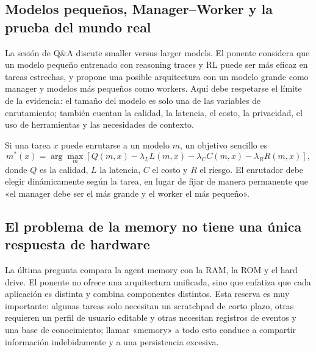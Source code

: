 \documentclass[a4paper]{article}
\begin{document}
\subsection{Modelos pequeños, Manager--Worker y la prueba del mundo real}

La sesión de Q\&A discute smaller versus larger models. El ponente considera que un modelo pequeño entrenado con reasoning traces y RL puede ser más eficaz en tareas estrechas, y propone una posible arquitectura con un modelo grande como manager y modelos más pequeños como workers. Aquí debe respetarse el límite de la evidencia: el tamaño del modelo es solo una de las variables de enrutamiento; también cuentan la calidad, la latencia, el costo, la privacidad, el uso de herramientas y las necesidades de contexto.


Si una tarea $x$ puede enrutarse a un modelo $m$, un objetivo sencillo es
\[
m^*(x)=\arg\max_m\left[
Q(m,x)-\lambda_L L(m,x)-\lambda_C C(m,x)-\lambda_R R(m,x)
\right],
\]
donde $Q$ es la calidad, $L$ la latencia, $C$ el costo y $R$ el riesgo. El enrutador debe elegir dinámicamente según la tarea, en lugar de fijar de manera permanente que «el manager debe ser el más grande y el worker el más pequeño».

\subsection{El problema de la memory no tiene una única respuesta de hardware}

La última pregunta compara la agent memory con la RAM, la ROM y el hard drive. El ponente no ofrece una arquitectura unificada, sino que enfatiza que cada aplicación es distinta y combina componentes distintos. Esta reserva es muy importante: algunas tareas solo necesitan un scratchpad de corto plazo, otras requieren un perfil de usuario editable y otras necesitan registros de eventos y una base de conocimiento; llamar «memory» a todo esto conduce a compartir información indebidamente y a una persistencia excesiva.

\end{document}
